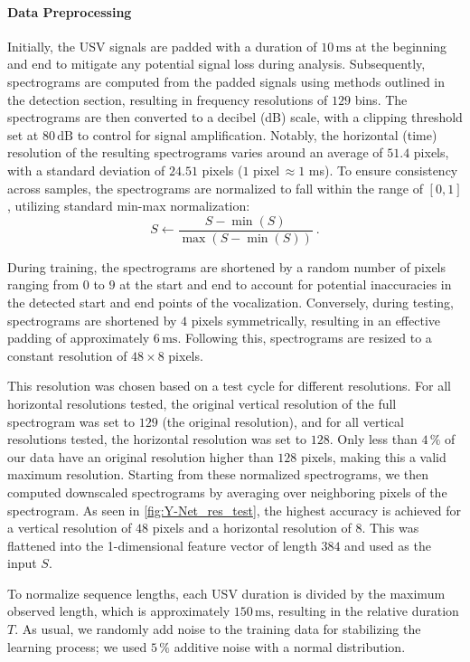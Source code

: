 \documentclass[preprint,NumberedRefs]{JASA}
\begin{document}
\paragraph{Data Preprocessing}
\label{sec:Data_preprocessing_FNN}

Initially, the USV signals are padded with a duration of \(10\,\mathrm{ms} \) at the beginning and end to mitigate any potential signal loss during analysis.
Subsequently, spectrograms are computed from the padded signals using methods outlined in the detection section, resulting in frequency resolutions of \(129\) bins.
The spectrograms are then converted to a decibel (dB) scale, with a clipping threshold set at \(80\,\mathrm{dB} \) to control for signal amplification.
Notably, the horizontal (time) resolution of the resulting spectrograms varies around an average of \(51.4\) pixels, with a standard deviation of \(24.51\) pixels (\(1\) pixel\,\(\approx 1\) ms).
To ensure consistency across samples, the spectrograms are normalized to fall within the range of \([0, 1]\), utilizing standard min-max normalization:
    \[S \gets \frac{S-\min(S)}{\max(S-\min(S))} \ .\]

During training, the spectrograms are shortened by a random number of pixels ranging from \(0\) to \(9\) at the start and end to account for potential inaccuracies in the detected start and end points of the vocalization.
Conversely, during testing, spectrograms are shortened by \(4\) pixels symmetrically, resulting in an effective padding of approximately \(6\,\mathrm{ms} \).
Following this, spectrograms are resized to a constant resolution of \(48\times 8\) pixels.

This resolution was chosen based on a test cycle for different resolutions. For all horizontal resolutions tested, the original vertical resolution of the full spectrogram was set to \(129\) (the original resolution), and for all vertical resolutions tested, the horizontal resolution was set to \(128\).
Only less than \(4\,\mathrm{\%} \) of our data have an original resolution higher than \(128\) pixels, making this a valid maximum resolution.
Starting from these normalized spectrograms, we then computed downscaled spectrograms by averaging over neighboring pixels of the spectrogram.
As seen in \autoref{fig:Y-Net_res_test}, the highest accuracy is achieved for a vertical resolution of \(48\) pixels and a horizontal resolution of \(8\).
This was flattened into the 1-dimensional feature vector of length \(384\) and used as the input \(S\).

To normalize sequence lengths, each USV duration is divided by the maximum observed length, which is approximately \(150\,\mathrm{ms} \), resulting in the relative duration \(T\).
As usual, we randomly add noise to the training data for stabilizing the learning process; we used \(5\,\mathrm{\%} \) additive noise with a normal distribution.
\end{document}
